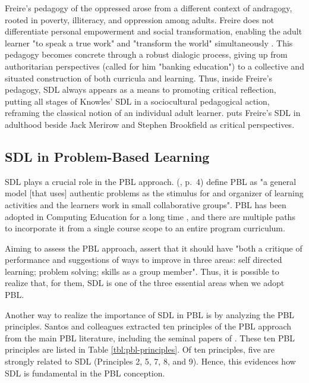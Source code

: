Freire's pedagogy of the oppressed \cite{freire:2000-oppressed} arose from a different context of andragogy, rooted in poverty, illiteracy, and oppression among adults. Freire does not differentiate personal empowerment and social transformation, enabling the adult learner "to speak a true work" and "transform the world" simultaneously \cite[p.~87]{freire:2000-oppressed}. This pedagogy becomes concrete through a robust dialogic process, giving up from authoritarian perspectives (called for him "banking education") to a collective and situated construction of both curricula and learning. Thus, inside Freire's pedagogy, \gls{SDL} always appears as a means to promoting critical reflection, putting all stages of Knowles' \gls{SDL} in a sociocultural pedagogical action, reframing the classical notion of an individual adult learner.  puts Freire's \gls{SDL} in adulthood beside Jack Merirow and Stephen Brookfield as critical perspectives.

\subsection{SDL in Problem-Based Learning}
\label{sdl-relations-ss:pbl}

\gls{SDL} plays a crucial role in the \gls{PBL} approach.  (\citeyear{savery:1995}, p.~4) define \gls{PBL} as "a general model [that uses] authentic problems as the stimulus for and organizer of learning activities and the learners work in small collaborative groups". \gls{PBL} has been adopted in Computing Education for a long time \cite{santos:2021}, and there are multiple paths to incorporate it from a single course scope to an entire program curriculum.

Aiming to assess the \gls{PBL} approach,  assert that it should have "both a critique of performance and suggestions of ways to improve in three areas: self directed learning; problem solving; skills as a group member". Thus, it is possible to realize that, for them, \gls{SDL} is one of the three essential areas when we adopt \gls{PBL}.

Another way to realize the importance of \gls{SDL} in \gls{PBL} is by analyzing the \gls{PBL} principles. Santos and colleagues \cite{santos:2013,santos:2014,santos:2016,arruda:2019} extracted ten principles of the \gls{PBL} approach from the main \gls{PBL} literature, including the seminal papers of . These ten \gls{PBL} principles are listed in Table \ref{tbl:pbl-principles}. Of ten principles, five are strongly related to \gls{SDL} (Principles 2, 5, 7, 8, and 9). Hence, this evidences how \gls{SDL} is fundamental in the \gls{PBL} conception.

